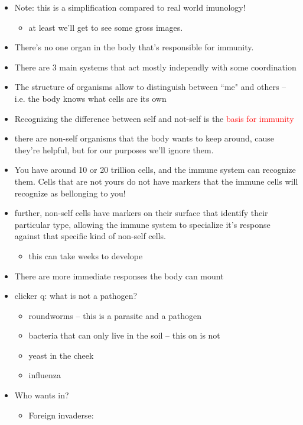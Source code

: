 \documentclass{article}
\theoremstyle{definition}
\begin{document}
\begin{itemize}
	\item Note: this is a simplification compared to real world imunology!
		\begin{itemize}
			\item at least we'll get to see some gross images.
		\end{itemize}
	\item There's no one organ in the body that's responsible for immunity.
	\item There are 3 main systems that act mostly independly with some coordination
	\item The structure of organisms allow to distinguish between ``me" and others -- i.e. the body knows what cells are its own
	\item  Recognizing the difference between self and not-self is the \textcolor{red}{basis for immunity}
	\item there are non-self organisms that the body wants to keep around, cause they're helpful, but for our purposes we'll ignore them.
	\item  You have around 10 or 20 trillion cells, and the immune system can recognize them. Cells that are not yours do not have markers that the immune cells will recognize as bellonging to you! 
	\item further, non-self cells have markers on their surface that identify their particular type, allowing the immune system to specialize it's response against that specific kind of non-self cells.
		\begin{itemize}
			\item this can take weeks to develope
		\end{itemize}
	\item There are more immediate responses the body can mount
	\item clicker q: what is not a pathogen?
		\begin{itemize}
			\item roundworms -- this is a parasite and a pathogen
			\item bacteria that can only live in the soil -- this on is not
			\item yeast in the cheek
			\item influenza
		\end{itemize}
	\item Who wants in?
		\begin{itemize}
			\item Foreign invaderse:
				\begin{itemize}

\end{itemize}
\end{itemize}
\end{itemize}
\end{document}
